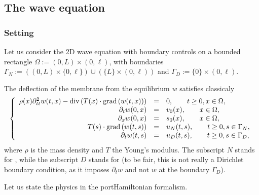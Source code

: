 \documentclass[letterpaper,10pt,english]{sphinxmanual}
\begin{document}
\sphinxstepscope


\subsection{The wave equation}
\label{\detokenize{examples/wave:the-wave-equation}}\label{\detokenize{examples/wave::doc}}

\subsubsection{Setting}
\label{\detokenize{examples/wave:setting}}\label{\detokenize{examples/wave:wave-2d}}
\sphinxAtStartPar
Let us consider the 2D wave equation with  boundary controls on a
bounded rectangle \(\Omega := (0, L) \times (0, \ell)\), with boundaries
\(\Gamma_N := \left( (0, L) \times \{ 0, \ell \} \right) \cup \left( \{ L \} \times (0, \ell) \right)\) and \(\Gamma_D := \{ 0 \} \times (0, \ell)\).

\sphinxAtStartPar
The deflection of the membrane from the equilibrium \(w\) satisfies
classicaly
\begin{equation*}
\begin{split}\left\lbrace
\begin{array}{rcl}
\rho(x) \partial_{tt}^2 w(t,x) - {\rm div} \left( T(x) \cdot {\rm grad} \left( w(t,x) \right) \right) &=& 0, \qquad t \ge 0, x \in \Omega, \\
\partial_t w(0,x) &=& v_0(x), \qquad x \in \Omega, \\
\partial_x w(0,x) &=& s_0(x), \qquad x \in \Omega, \\
T(s) \cdot {\rm grad} \left( w(t,s) \right) &=& u_N(t,s), \qquad t \ge 0, s \in \Gamma_N, \\
\partial_t w(t,s) &=& u_D(t,s), \qquad t \ge 0, s \in \Gamma_D,
\end{array}
\right.\end{split}
\end{equation*}
\sphinxAtStartPar
where \(\rho\) is the mass density and \(T\) the Young’s
modulus. The subscript \(N\) stands for , while the
subscript \(D\) stands for  (to be fair, this is not
really a Dirichlet boundary condition, as it imposes
\(\partial_t w\) and not \(w\) at the boundary
\(\Gamma_D\)).

\sphinxAtStartPar
Let us state the physics in the port\sphinxhyphen{}Hamiltonian formalism.
\end{document}
